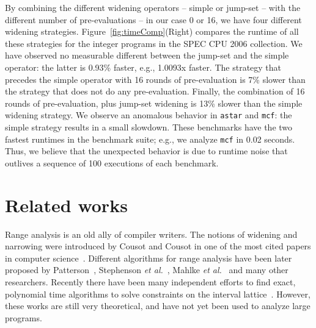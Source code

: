 \documentclass[times]{speauth}
\begin{document}
By combining the different widening operators -- simple or jump-set -- with
the different number of pre-evaluations -- in our case 0 or 16, we have four
different widening strategies.
Figure~\ref{fig:timeComp}(Right) compares the runtime of all these strategies
for the integer programs in the SPEC CPU 2006 collection.
We have observed no measurable different between the jump-set and the simple
operator: the latter is 0.93\% faster, e.g., 1.0093x faster.
The strategy that precedes the simple operator with 16 rounds of pre-evaluation
is 7\% slower than the strategy that does not do any pre-evaluation.
Finally, the combination of 16 rounds of pre-evaluation, plus jump-set widening
is 13\% slower than the simple widening strategy.
We observe an anomalous behavior in \texttt{astar} and \texttt{mcf}: the simple
strategy results in a small slowdown.
These benchmarks have the two fastest runtimes in the benchmark suite; e.g.,
we analyze \texttt{mcf} in 0.02 seconds.
Thus, we believe that the unexpected behavior is due to runtime noise that
outlives a sequence of 100 executions of each benchmark.


\section{Related works}
\label{sec:rel}

Range analysis is an old ally of compiler writers.
The notions of widening and narrowing were introduced by Cousot and Cousot in
one of the most cited papers in computer science~\cite{Cousot77}.
Different algorithms for range analysis have been later proposed
by Patterson~\cite{Patterson95}, Stephenson {\em et al.}~\cite{Stephenson00},
Mahlke {\em et al.}~\cite{Mahlke01} and many other researchers.
Recently there have been many independent efforts to find exact, polynomial
time algorithms to solve constraints on the interval
lattice~\cite{Costan05,Gawlitza09,Lakhdar11,Su04,Su05}.
However, these works are still very theoretical, and have not yet been used to
analyze large programs.
\end{document}
